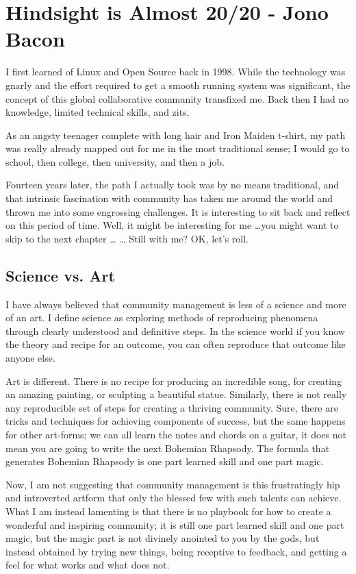 \chapter{Hindsight is Almost 20/20 - Jono Bacon}
I first learned of Linux and Open Source back in 1998. While the technology was
gnarly and the effort required to get a smooth running system was significant,
the concept of this global collaborative community transfixed me. Back then I
had no knowledge, limited technical skills, and zits.

As an angsty teenager complete with long hair and Iron Maiden t-shirt, my path
was really already mapped out for me in the most traditional sense; I would go
to school, then college, then university, and then a job.

Fourteen years later, the path I actually took was by no means traditional, and
that intrinsic fascination with community has taken me around the world and
thrown me into some engrossing challenges. It is interesting to sit back and
reflect on this period of time. Well, it might be interesting for me \dots you
might want to skip to the next chapter \dots 
\newline
\dots
\newline
Still with me? OK, let’s roll.

\section*{Science vs. Art}

I have always believed that community management is less of a science and more
of an art. I define science as exploring methods of reproducing phenomena
through clearly understood and definitive steps. In the science world if you
know the theory and recipe for an outcome, you can often reproduce that outcome
like anyone else.

Art is different. There is no recipe for producing an incredible song, for
creating an amazing painting, or sculpting a beautiful statue. Similarly, there
is not really any reproducible set of steps for creating a thriving community.
Sure, there are tricks and techniques for achieving components of success, but
the same happens for other art-forms; we can all learn the notes and chords on a
guitar, it does not mean you are going to write the next Bohemian Rhapsody. The
formula that generates Bohemian Rhapsody is one part learned skill and one part
magic.

Now, I am not suggesting that community management is this frustratingly hip and
introverted artform that only the blessed few with such talents can achieve.
What I am instead lamenting is that there is no playbook for how to create a
wonderful and inspiring community; it is still one part learned skill and one
part magic, but the magic part is not divinely anointed to you by the gods, but
instead obtained by trying new things, being receptive to feedback, and getting
a feel for what works and what does not.

